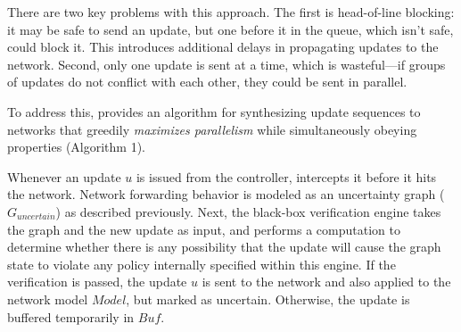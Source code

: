 There are two key problems with this approach.
The first is head-of-line blocking: it may be safe to send an update, but one before it in the queue, which isn't safe, could block it. This introduces additional delays in propagating updates
to the network.
Second, only one update is sent at a time, which is wasteful---if groups of updates do not conflict with each other, they could be sent in parallel.

To address this,
\name provides an algorithm for synthesizing update sequences to networks that greedily {\em maximizes parallelism} while
simultaneously obeying  properties
(Algorithm 1).%

Whenever an update $u$ is issued from the controller, 
\name intercepts it before it hits the network.
Network forwarding behavior is modeled as 
an uncertainty graph ($G_{uncertain}$) as described previously.
Next, the black-box verification engine takes the graph and the new update as input,
and performs a computation to determine whether there is any possibility that the
update will cause the graph state to violate
any policy internally specified within this engine.
If the verification is passed, the update $u$ is sent to the network
and also applied to the network model $Model$, but marked as uncertain.
Otherwise, the update is buffered temporarily in $Buf$.

